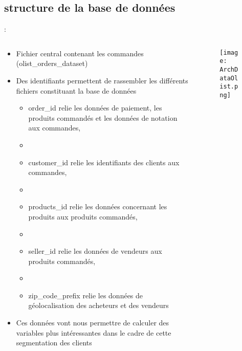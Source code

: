 \documentclass[8pt,aspectratio=169,hyperref={unicode=true}]{beamer}
\begin{document}
\subsection{structure de la base de données}
\begin{frame}{\insertsection: \insertsubsection}
    \begin{columns}
        \begin{column}{.4\textwidth}
            \begin{itemize}
                \item Fichier central contenant les commandes (olist\_orders\_dataset)
                \item Des identifiants permettent de rassembler les différents fichiers constituant la base de données
                      \begin{itemize}
                          \item order\_id relie les données de paiement, les produits commandés et les données de notation aux commandes,
                          \item[]
                          \item customer\_id relie les identifiants des clients aux commandes,
                          \item[]
                          \item products\_id relie les données concernant les produits aux produits commandés,
                          \item[]
                          \item seller\_id relie les données de vendeurs aux produits commandés,
                          \item[]
                          \item zip\_code\_prefix relie les données de géolocalisation des acheteurs et des vendeurs
                      \end{itemize}
                \item Ces données vont nous permettre de calculer des variables plus intéressantes dans le cadre de cette segmentation des clients
            \end{itemize}
        \end{column}
        \begin{column}{.6\textwidth}
            \begin{figure}
                \texttt{[image: ArchDataOlist.png]}
            \end{figure}
        \end{column}
    \end{columns}
\end{frame}
\end{document}
